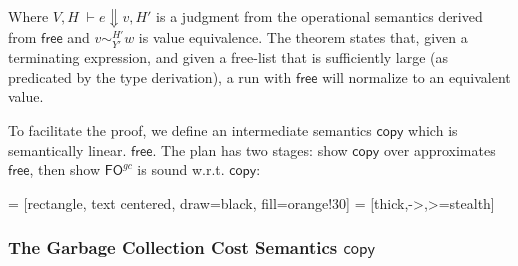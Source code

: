 \documentclass{easychair}
\newcommand{\ms}[1]{\ensuremath{\mathsf{#1}}}
\newcommand{\veq}[4]{#3 \sim^{#1}_{#2} #4}
\newcommand{\fogc}{\ms{FO}^{gc}}
\theoremstyle{definition}
\begin{document}
Where $V,H \; \vdash e \Downarrow v, H'$ is a judgment from the operational semantics
derived from $\ms{free}$ and $\veq{H'}{Y'}{v}{w}$ is value equivalence. The theorem states that,
given a terminating expression,
and given a free-list that is sufficiently large (as predicated by the type derivation), 
a run with $\ms{free}$ will normalize to an equivalent value.

To facilitate the proof, we define an intermediate semantics $\ms{copy}$ 
which is semantically linear. $\ms{free}$. The plan has two stages: show $\ms{copy}$ over 
approximates $\ms{free}$, then show $\fogc$ is sound w.r.t. $\ms{copy}$:

 = [rectangle, text centered, draw=black, fill=orange!30]
 = [thick,->,>=stealth]

\begin{center}
\end{center}

\subsubsection{The Garbage Collection Cost Semantics $\ms{copy}$}
\label{sect:copy}
\end{document}

